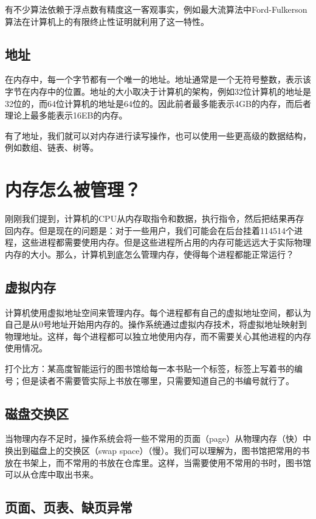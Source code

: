 有不少算法依赖于浮点数有精度这一客观事实，例如最大流算法中Ford-Fulkerson算法在计算机上的有限终止性证明就利用了这一特性。

\subsection{地址}

在内存中，每一个字节都有一个唯一的地址。地址通常是一个无符号整数，表示该字节在内存中的位置。地址的大小取决于计算机的架构，例如32位计算机的地址是32位的，而64位计算机的地址是64位的。因此前者最多能表示4GB的内存，而后者理论上最多能表示16EB的内存。

有了地址，我们就可以对内存进行读写操作，也可以使用一些更高级的数据结构，例如数组、链表、树等。

\section{内存怎么被管理？}

刚刚我们提到，计算机的CPU从内存取指令和数据，执行指令，然后把结果再存回内存。但是现在的问题是：对于一些用户，我们可能会在后台挂着114514个进程，这些进程都需要使用内存。但是这些进程所占用的内存可能远远大于实际物理内存的大小。那么，计算机到底怎么管理内存，使得每个进程都能正常运行？

\subsection{虚拟内存}

计算机使用虚拟地址空间来管理内存。每个进程都有自己的虚拟地址空间，都认为自己是从0号地址开始用内存的。操作系统通过虚拟内存技术，将虚拟地址映射到物理地址。这样，每个进程都可以独立地使用内存，而不需要关心其他进程的内存使用情况。

打个比方：某高度智能运行的图书馆给每一本书贴一个标签，标签上写着书的编号；但是读者不需要管实际上书放在哪里，只需要知道自己的书编号就行了。

\subsection{磁盘交换区}

当物理内存不足时，操作系统会将一些不常用的页面（page）从物理内存（快）中换出到磁盘上的交换区（swap space）（慢）。我们可以理解为，图书馆把常用的书放在书架上，而不常用的书放在仓库里。这样，当需要使用不常用的书时，图书馆可以从仓库中取出书来。

\subsection{页面、页表、缺页异常}

